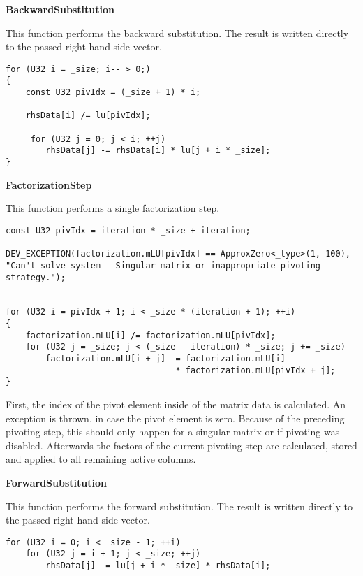 \vspace{1cm}
\textbf{BackwardSubstitution}
\vspace{0.5cm}

This function performs the backward substitution.
The result is written directly to the passed right-hand side vector.

\begin{verbatim}
for (U32 i = _size; i-- > 0;)
{
    const U32 pivIdx = (_size + 1) * i;

    rhsData[i] /= lu[pivIdx];

     for (U32 j = 0; j < i; ++j)
        rhsData[j] -= rhsData[i] * lu[j + i * _size];
}
\end{verbatim}

\vspace{1cm}
\textbf{FactorizationStep}
\vspace{0.5cm}

This function performs a single factorization step.

\begin{verbatim}
const U32 pivIdx = iteration * _size + iteration;

DEV_EXCEPTION(factorization.mLU[pivIdx] == ApproxZero<_type>(1, 100),
"Can't solve system - Singular matrix or inappropriate pivoting strategy.");


for (U32 i = pivIdx + 1; i < _size * (iteration + 1); ++i)
{
    factorization.mLU[i] /= factorization.mLU[pivIdx];
    for (U32 j = _size; j < (_size - iteration) * _size; j += _size)
        factorization.mLU[i + j] -= factorization.mLU[i] 
                                  * factorization.mLU[pivIdx + j];
}
\end{verbatim}

First, the index of the pivot element inside of the matrix data is calculated.
An exception is thrown, in case the pivot element is zero.
Because of the preceding pivoting step, this should only happen for a singular matrix or if pivoting was disabled.
Afterwards the factors of the current pivoting step are calculated, stored and applied to all remaining active columns.


\vspace{1cm}
\textbf{ForwardSubstitution}
\vspace{0.5cm}

This function performs the forward substitution.
The result is written directly to the passed right-hand side vector.

\begin{verbatim}
for (U32 i = 0; i < _size - 1; ++i)
    for (U32 j = i + 1; j < _size; ++j)
        rhsData[j] -= lu[j + i * _size] * rhsData[i];
\end{verbatim}


